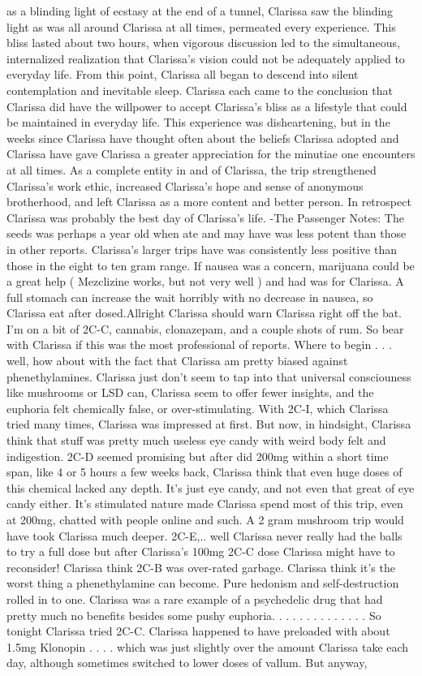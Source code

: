\documentclass[12pt]{book}
\begin{document}
as a blinding light of ecstasy at the end of a tunnel, Clarissa saw the blinding light as was all around Clarissa at all times, permeated every experience. This bliss lasted about two hours, when vigorous discussion led to the simultaneous, internalized realization that Clarissa's vision could not be adequately applied to everyday life. From this point, Clarissa all began to descend into silent contemplation and inevitable sleep. Clarissa each came to the conclusion that Clarissa did have the willpower to accept Clarissa's bliss as a lifestyle that could be maintained in everyday life. This experience was disheartening, but in the weeks since Clarissa have thought often about the beliefs Clarissa adopted and Clarissa have gave Clarissa a greater appreciation for the minutiae one encounters at all times. As a complete entity in and of Clarissa, the trip strengthened Clarissa's work ethic, increased Clarissa's hope and sense of anonymous brotherhood, and left Clarissa as a more content and better person. In retrospect Clarissa was probably the best day of Clarissa's life. -The Passenger Notes: The seeds was perhaps a year old when ate and may have was less potent than those in other reports. Clarissa's larger trips have was consistently less positive than those in the eight to ten gram range. If nausea was a concern, marijuana could be a great help ( Mezclizine works, but not very well ) and had was for Clarissa. A full stomach can increase the wait horribly with no decrease in nausea, so Clarissa eat after dosed.Allright Clarissa should warn Clarissa right off the bat. I'm on a bit of 2C-C, cannabis, clonazepam, and a couple shots of rum. So bear with Clarissa if this was the most professional of reports. Where to begin . . .  well, how about with the fact that Clarissa am pretty biased against phenethylamines. Clarissa just don't seem to tap into that universal consciouness like mushrooms or LSD can, Clarissa seem to offer fewer insights, and the euphoria felt chemically false, or over-stimulating. With 2C-I, which Clarissa tried many times, Clarissa was impressed at first. But now, in hindsight, Clarissa think that stuff was pretty much useless eye candy with weird body felt and indigestion. 2C-D seemed promising but after did 200mg within a short time span, like 4 or 5 hours a few weeks back, Clarissa think that even huge doses of this chemical lacked any depth. It's just eye candy, and not even that great of eye candy either. It's stimulated nature made Clarissa spend most of this trip, even at 200mg, chatted with people online and such. A 2 gram mushroom trip would have took Clarissa much deeper. 2C-E,.. well Clarissa never really had the balls to try a full dose but after Clarissa's 100mg 2C-C dose Clarissa might have to reconsider! Clarissa think 2C-B was over-rated garbage. Clarissa think it's the worst thing a phenethylamine can become. Pure hedonism and self-destruction rolled in to one. Clarissa was a rare example of a psychedelic drug that had pretty much no benefits besides some pushy euphoria.  . . .   . . .   . . .   . . .  . So tonight Clarissa tried 2C-C. Clarissa happened to have preloaded with about 1.5mg Klonopin . . .  . which was just slightly over the amount Clarissa take each day, although sometimes switched to lower doses of vallum. But anyway, 
\end{document}
